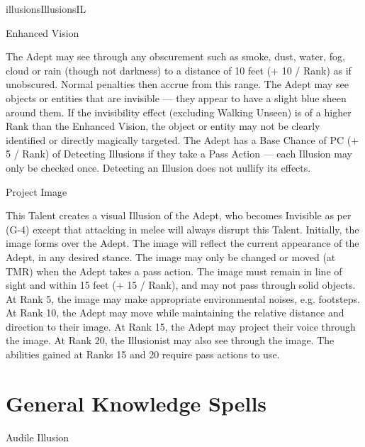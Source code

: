 \begin{College}[1.5]{illusions}{Illusions}{IL}
\begin{talent}[T-2]{Enhanced Vision}

\begin{effects}
The Adept may see through any obscurement such as smoke, dust, water,
fog, cloud or rain (though not darkness) to a distance of 10 feet (+
10 / Rank) as if unobscured.  Normal penalties then accrue from this
range. The Adept may see objects or entities that are invisible — they
appear to have a slight blue sheen around them.  If the invisibility
effect (excluding Walking Unseen) is of a higher Rank than the
Enhanced Vision, the object or entity may not be clearly identified or
directly magically targeted. The Adept has a Base Chance of PC (+ 5 /
Rank) of Detecting Illusions if they take a Pass Action --- each
Illusion may only be checked once.  Detecting an Illusion does not
nullify its effects.
\end{effects}
\end{talent}

\begin{talent}[T-3]{Project Image}

\begin{effects}
This Talent creates a visual Illusion of the Adept, who becomes
Invisible as per (G-4) except that attacking in melee will always
disrupt this Talent.  Initially, the image forms over the Adept.  The
image will reflect the current appearance of the Adept, in any desired
stance.  The image may only be changed or moved (at TMR) when the
Adept takes a pass action. The image must remain in line of sight and
within 15 feet (+ 15 / Rank), and may not pass through solid objects.
At Rank 5, the image may make appropriate environmental noises,
e.g. footsteps.  At Rank 10, the Adept may move while maintaining the
relative distance and direction to their image.  At Rank 15, the Adept
may project their voice through the image. At Rank 20, the Illusionist
may also see through the image.  The abilities gained at Ranks 15 and
20 require pass actions to use.
\end{effects}
\end{talent}

\section{General Knowledge Spells}

\begin{spell}[G-1]{Audile Illusion}


\end{spell}
\end{College}
